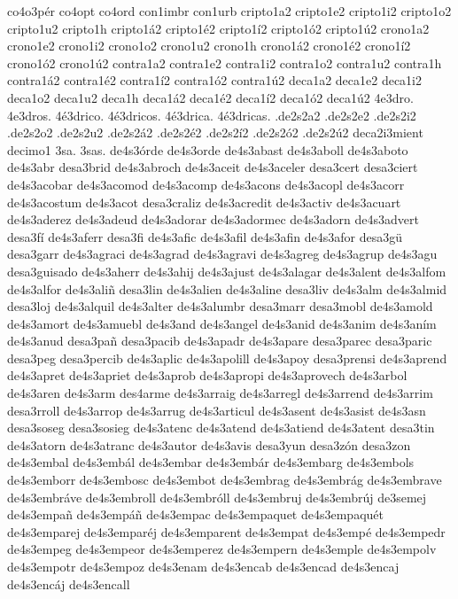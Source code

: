{co4o3p^^e9r
co4opt
co4ord
con1imbr
con1urb
cripto1a2 cripto1e2 cripto1i2 cripto1o2 cripto1u2 cripto1h
cripto1^^e12 cripto1^^e92 cripto1^^ed2 cripto1^^f32 cripto1^^fa2
crono1a2 crono1e2 crono1i2 crono1o2 crono1u2 crono1h
crono1^^e12 crono1^^e92 crono1^^ed2 crono1^^f32 crono1^^fa2
contra1a2 contra1e2 contra1i2 contra1o2 contra1u2 contra1h
contra1^^e12 contra1^^e92 contra1^^ed2 contra1^^f32 contra1^^fa2
deca1a2 deca1e2 deca1i2 deca1o2 deca1u2 deca1h
deca1^^e12 deca1^^e92 deca1^^ed2 deca1^^f32 deca1^^fa2
4e3dro. 4e3dros. 4^^e93drico. 4^^e93dricos. 4^^e93drica.
4^^e93dricas.
.de2s2a2 .de2s2e2 .de2s2i2 .de2s2o2 .de2s2u2 
.de2s2^^e12 .de2s2^^e92 .de2s2^^ed2 .de2s2^^f32 .de2s2^^fa2
deca2i3mient
decimo1
3sa. 3sas.
de4s3^^f3rde
de4s3orde
de4s3abast
de4s3aboll
de4s3aboto
de4s3abr
desa3brid
de4s3abroch
de4s3aceit
de4s3aceler
desa3cert
desa3ciert
de4s3acobar
de4s3acomod
de4s3acomp
de4s3acons
de4s3acopl
de4s3acorr
de4s3acostum
de4s3acot
desa3craliz
de4s3acredit
de4s3activ
de4s3acuart
de4s3aderez
de4s3adeud
de4s3adorar
de4s3adormec
de4s3adorn
de4s3advert
desa3f^^ed
de4s3aferr
desa3fi
de4s3afic
de4s3afil
de4s3afin
de4s3afor
desa3g^^fc
desa3garr
de4s3agraci
de4s3agrad
de4s3agravi
de4s3agreg
de4s3agrup
de4s3agu
desa3guisado
de4s3aherr
de4s3ahij
de4s3ajust
de4s3alagar
de4s3alent
de4s3alfom
de4s3alfor
de4s3ali^^f1
desa3lin
de4s3alien
de4s3aline
desa3liv
de4s3alm
de4s3almid
desa3loj
de4s3alquil
de4s3alter
de4s3alumbr
desa3marr
desa3mobl
de4s3amold
de4s3amort
de4s3amuebl
de4s3and
de4s3angel
de4s3anid
de4s3anim
de4s3an^^edm
de4s3anud
desa3pa^^f1
desa3pacib
de4s3apadr
de4s3apare
desa3parec
desa3paric
desa3peg
desa3percib
de4s3aplic
de4s3apolill
de4s3apoy
desa3prensi
de4s3aprend
de4s3apret
de4s3apriet
de4s3aprob
de4s3apropi
de4s3aprovech
de4s3arbol
de4s3aren
de4s3arm
des4arme
de4s3arraig
de4s3arregl
de4s3arrend
de4s3arrim
desa3rroll
de4s3arrop
de4s3arrug
de4s3articul
de4s3asent
de4s3asist
de4s3asn
desa3soseg
desa3sosieg
de4s3atenc
de4s3atend
de4s3atiend
de4s3atent
desa3tin
de4s3atorn
de4s3atranc
de4s3autor
de4s3avis
desa3yun
desa3z^^f3n
desa3zon
de4s3embal
de4s3emb^^e1l
de4s3embar
de4s3emb^^e1r
de4s3embarg
de4s3embols
de4s3emborr
de4s3embosc
de4s3embot
de4s3embrag
de4s3embr^^e1g
de4s3embrave
de4s3embr^^e1ve
de4s3embroll
de4s3embr^^f3ll
de4s3embruj
de4s3embr^^faj
de3semej
de4s3empa^^f1
de4s3emp^^e1^^f1
de4s3empac
de4s3empaquet
de4s3empaqu^^e9t
de4s3emparej
de4s3empar^^e9j
de4s3emparent
de4s3empat
de4s3emp^^e9
de4s3empedr
de4s3empeg
de4s3empeor
de4s3emperez
de4s3empern
de4s3emple
de4s3empolv
de4s3empotr
de4s3empoz
de4s3enam
de4s3encab
de4s3encad
de4s3encaj
de4s3enc^^e1j
de4s3encall
}
